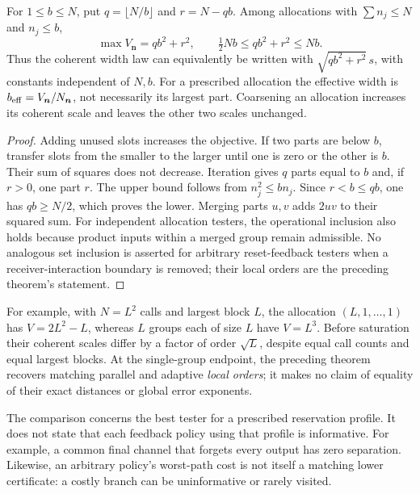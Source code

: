 \begin{corollary}\label{cor:profilebudget89}
For $1\le b\le N$, put $q=\lfloor N/b\rfloor$ and $r=N-qb$.
Among allocations with $\sum n_j\le N$ and $n_j\le b$,
\begin{equation}\label{eq:profilemax89}
 \max V_{\boldsymbol n}=qb^2+r^2,
 \qquad \tfrac12Nb\le qb^2+r^2\le Nb.
\end{equation}
Thus the coherent width law can equivalently be written with
$\sqrt{qb^2+r^2}\,s$, with constants independent of $N,b$.
For a prescribed allocation the effective width is
$b_{\rm eff}=V_{\boldsymbol n}/N_{\boldsymbol n}$, not necessarily
its largest part.  Coarsening an allocation increases its coherent
scale and leaves the other two scales unchanged.
\end{corollary}
\begin{proof}
Adding unused slots increases the objective.  If two parts are below
$b$, transfer slots from the smaller to the larger until one is zero
or the other is $b$.  Their sum of squares does not decrease.
Iteration gives $q$ parts equal to $b$ and, if $r>0$, one part $r$.
The upper bound follows from $n_j^2\le bn_j$.
Since $r<b\le qb$, one has $qb\ge N/2$, which proves the lower.
Merging parts $u,v$ adds $2uv$ to their squared sum.  For independent allocation testers, the operational
inclusion also holds because product inputs within a merged group
remain admissible.  No analogous set inclusion is asserted for
arbitrary reset-feedback testers when a receiver-interaction boundary
is removed; their local orders are the preceding theorem's statement.
\end{proof}

For example, with $N=L^2$ calls and largest block $L$, the allocation
$(L,1,\ldots,1)$ has $V=2L^2-L$, whereas $L$ groups each of size $L$
have $V=L^3$.  Before saturation their coherent scales differ by a
factor of order $\sqrt L$, despite equal call counts and equal largest
blocks.  At the single-group endpoint, the preceding theorem recovers
matching parallel and adaptive \emph{local orders}; it makes no claim
of equality of their exact distances or global error exponents.

The comparison concerns the best tester for a prescribed reservation
profile.  It does not state that each feedback policy using that
profile is informative.  For example, a common final channel that
forgets every output has zero separation.  Likewise, an arbitrary
policy's worst-path cost is not itself a matching lower certificate:
a costly branch can be uninformative or rarely visited.
